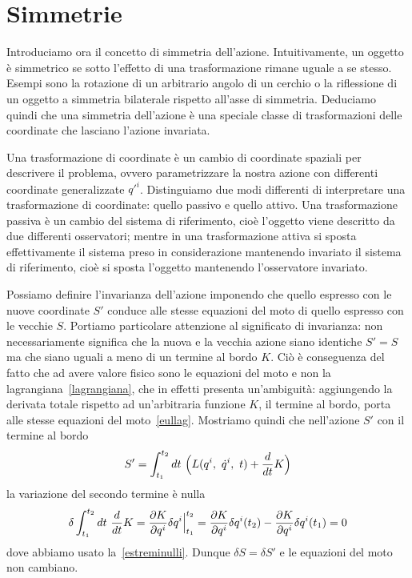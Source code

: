 \section{Simmetrie}
    
    Introduciamo ora il concetto di simmetria dell'azione. Intuitivamente, un oggetto è simmetrico se sotto l'effetto di una trasformazione rimane uguale a se stesso. Esempi sono la rotazione di un arbitrario angolo di un cerchio o la riflessione di un oggetto a simmetria bilaterale rispetto all'asse di simmetria. Deduciamo quindi che una simmetria dell'azione è una speciale classe di trasformazioni delle coordinate che lasciano l'azione invariata. 
    
    Una trasformazione di coordinate è un cambio di coordinate spaziali per descrivere il problema, ovvero parametrizzare la nostra azione con differenti coordinate generalizzate $q'^i$. Distinguiamo due modi differenti di interpretare una trasformazione di coordinate: quello passivo e quello attivo. Una trasformazione passiva è un cambio del sistema di riferimento, cioè l'oggetto viene descritto da due differenti osservatori; mentre in una trasformazione attiva si sposta effettivamente il sistema preso in considerazione mantenendo invariato il sistema di riferimento, cioè si sposta l'oggetto mantenendo l'osservatore invariato. 
    
    Possiamo definire l'invarianza dell'azione imponendo che quello espresso con le nuove coordinate $S'$ conduce alle stesse equazioni del moto di quello espresso con le vecchie $S$. Portiamo particolare attenzione al significato di invarianza: non necessariamente significa che la nuova e la vecchia azione siano identiche $S' = S$ ma che siano uguali a meno di un termine al bordo $K$. Ciò è conseguenza del fatto che ad avere valore fisico sono le equazioni del moto e non la lagrangiana~\eqref{lagrangiana}, che in effetti presenta un'ambiguità: aggiungendo la derivata totale rispetto ad un'arbitraria funzione $K$, il termine al bordo, porta alle stesse equazioni del moto~\eqref{eullag}. Mostriamo quindi che nell'azione $S'$ con il termine al bordo
    \begin{equation*}
        S' = \int_{t_1}^{t_2}dt~ \Big ( L(q^i, ~ \dot q^i, ~t) + \frac{d}{dt} K \Big)
    \end{equation*}
    la variazione del secondo termine è nulla
    \begin{equation*}
        \delta \int_{t_1}^{t_2}dt~ \frac{d}{dt} K = \frac{\partial K}{\partial q^i} \delta q^i \Big \vert_{t_1}^{t_2} = \frac{\partial K}{\partial q^i} \delta q^i (t_2) - \frac{\partial K}{\partial q^i} \delta q^i (t_1) = 0
    \end{equation*} 
    dove abbiamo usato la~\eqref{estreminulli}. Dunque $\delta S = \delta S'$ e le equazioni del moto non cambiano.


